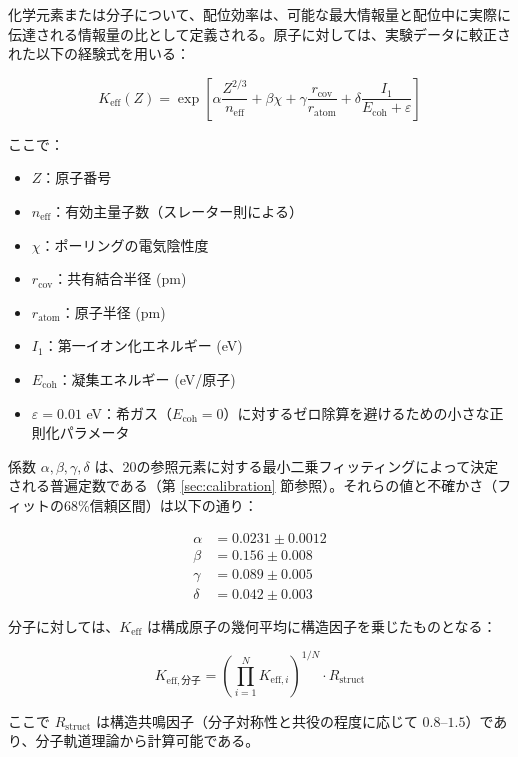 \documentclass[11pt,a4paper]{article}
\newcommand{\Keff}{K_{\mathrm{eff}}}
\newcommand{\Rstruct}{R_{\mathrm{struct}}}
\begin{document}
	化学元素または分子について、配位効率は、可能な最大情報量と配位中に実際に伝達される情報量の比として定義される。原子に対しては、実験データに較正された以下の経験式を用いる：
	
	\begin{equation}
		\Keff(Z) = \exp\left[\alpha \frac{Z^{2/3}}{n_{\text{eff}}} + \beta \chi + \gamma \frac{r_{\text{cov}}}{r_{\text{atom}}} + \delta \frac{I_1}{E_{\text{coh}} + \varepsilon}\right]
		\label{eq:keff-element}
	\end{equation}
	
	ここで：
	\begin{itemize}
		\item $Z$：原子番号
		\item $n_{\text{eff}}$：有効主量子数（スレーター則による）
		\item $\chi$：ポーリングの電気陰性度
		\item $r_{\text{cov}}$：共有結合半径 (pm)
		\item $r_{\text{atom}}$：原子半径 (pm)
		\item $I_1$：第一イオン化エネルギー (eV)
		\item $E_{\text{coh}}$：凝集エネルギー (eV/原子)
		\item $\varepsilon = 0.01$ eV：希ガス（$E_{\text{coh}} = 0$）に対するゼロ除算を避けるための小さな正則化パラメータ
	\end{itemize}
	
	係数 $\alpha, \beta, \gamma, \delta$ は、20の参照元素に対する最小二乗フィッティングによって決定される普遍定数である（第 \ref{sec:calibration} 節参照）。それらの値と不確かさ（フィットの68\%信頼区間）は以下の通り：
	
	\begin{align}
		\alpha &= 0.0231 \pm 0.0012 \\
		\beta &= 0.156 \pm 0.008 \\
		\gamma &= 0.089 \pm 0.005 \\
		\delta &= 0.042 \pm 0.003
	\end{align}
	
	分子に対しては、$\Keff$ は構成原子の幾何平均に構造因子を乗じたものとなる：
	
	\begin{equation}
		K_{\mathrm{eff},\text{分子}} = \left(\prod_{i=1}^{N} K_{\mathrm{eff},i}\right)^{1/N} \cdot \Rstruct
		\label{eq:keff-molecule}
	\end{equation}
	
	ここで $\Rstruct$ は構造共鳴因子（分子対称性と共役の程度に応じて $0.8$--$1.5$）であり、分子軌道理論から計算可能である。
	
\end{document}
